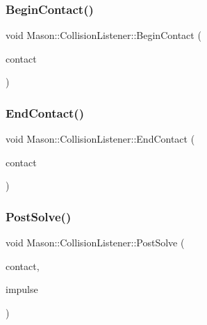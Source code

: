 \subsubsection{\texorpdfstring{Begin\+Contact()}{BeginContact()}}
{\footnotesize\ttfamily void Mason\+::\+Collision\+Listener\+::\+Begin\+Contact (\begin{DoxyParamCaption}\item[{b2\+Contact $\ast$}]{contact }\end{DoxyParamCaption})\hspace{0.3cm}{\ttfamily [virtual]}}

\hypertarget{class_mason_1_1_collision_listener_a58250c23f5fe17721c186a9d22408576}{}\label{class_mason_1_1_collision_listener_a58250c23f5fe17721c186a9d22408576} 
\subsubsection{\texorpdfstring{End\+Contact()}{EndContact()}}
{\footnotesize\ttfamily void Mason\+::\+Collision\+Listener\+::\+End\+Contact (\begin{DoxyParamCaption}\item[{b2\+Contact $\ast$}]{contact }\end{DoxyParamCaption})\hspace{0.3cm}{\ttfamily [virtual]}}

\hypertarget{class_mason_1_1_collision_listener_a974aee4f4b2068706e87a887c842eb66}{}\label{class_mason_1_1_collision_listener_a974aee4f4b2068706e87a887c842eb66} 
\subsubsection{\texorpdfstring{Post\+Solve()}{PostSolve()}}
{\footnotesize\ttfamily void Mason\+::\+Collision\+Listener\+::\+Post\+Solve (\begin{DoxyParamCaption}\item[{b2\+Contact $\ast$}]{contact,  }\item[{const b2\+Contact\+Impulse $\ast$}]{impulse }\end{DoxyParamCaption})\hspace{0.3cm}{\ttfamily [virtual]}}

